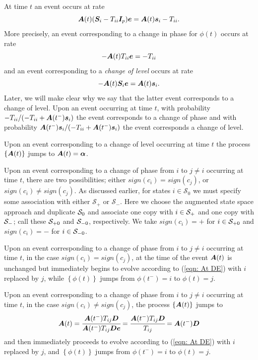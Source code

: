 At time \(t\) an event occurs at rate 
\[\boldsymbol A(t) (\boldsymbol{S}_i - T_{ii}\boldsymbol{I}_p)\boldsymbol e = \boldsymbol A(t)\boldsymbol s_i - T_{ii}.\]
More precisely, an event corresponding to a change in phase for \({\phi}(t)\) occurs at rate \[-\boldsymbol A(t) T_{ii}\boldsymbol e = -T_{ii}\] and an event corresponding to a \emph{change of level} occurs at rate \[-\boldsymbol A(t) \boldsymbol{S}_i\boldsymbol e = \boldsymbol A(t) \boldsymbol s_i.\] Later, we will make clear why we say that the latter event corresponds to a change of level. Upon an event occurring at time \(t\), with probability \({-T_{ii}}/{\left(-T_{ii} + \boldsymbol A({t^-})\boldsymbol s_i\right)}\) the event corresponds to a change of phase and with probability \({\boldsymbol A({t^-})\boldsymbol s_i}/{\left(-T_{ii} + \boldsymbol A({t^-})\boldsymbol s_i\right)}\) the event corresponds a change of level. 

Upon an event corresponding to a change of level occurring at time \(t\) the process \(\{\boldsymbol A(t)\}\) jumps to
\(\boldsymbol A(t) = \boldsymbol \alpha\). 

Upon an event corresponding to a change of phase from \(i\) to \(j\neq i\) occurring at time \(t\), there are two possibilities; either \(sign(c_i)=sign(c_j)\), or \(sign(c_i)\neq sign(c_j)\). As discussed earlier, for states \(i\in\mathcal S_0\) we must specify some association with either \(\mathcal S_+\) or \(\mathcal S_-\). Here we choose the augmented state space approach and duplicate \(\mathcal{S}_0\) and associate one copy with \(i\in\mathcal{S}_+\) and one copy with \(\mathcal{S}_-\); call these \(\mathcal{S}_{+0}\) and \(\mathcal{S}_{-0}\), respectively. We take \(sign(c_i)=+\) for \(i\in\mathcal{S}_{+0}\) and \(sign(c_i)=-\) for \(i\in\mathcal{S}_{-0}\).

Upon an event corresponding to a change of phase from \(i\) to \(j\neq i\) occurring at time \(t\), in the case \(sign(c_i)=sign(c_j)\), at the time of the event \(\boldsymbol A(t)\) is unchanged but immediately begins to evolve according to (\ref{eqn: At DE}) with \(i\) replaced by \(j\), while \(\left\{{\phi}(t)\right\}\) jumps from \({\phi}(t^-)=i\) to \({\phi}(t)=j\). 

Upon an event corresponding to a change of phase from \(i\) to \(j\neq i\) occurring at time \(t\), in the case \(sign(c_i)\neq sign(c_j)\), the process \(\{\boldsymbol A(t)\}\) jumps to 
\[\boldsymbol A(t) = \cfrac{\boldsymbol A({t^-}) T_{ij}\boldsymbol{D}}{\boldsymbol A({t^-}) T_{ij} \boldsymbol{D} \boldsymbol e} = \cfrac{\boldsymbol A({t^-}) T_{ij}\boldsymbol{D}}{T_{ij} } = \boldsymbol A({t^-}) \boldsymbol{D} \] 
and then immediately proceeds to evolve according to (\ref{eqn: At DE}) with \(i\) replaced by \(j\), and \(\left\{{\phi}(t)\right\}\) jumps from \({\phi}(t^-)=i\) to \({\phi}(t)=j\). 

